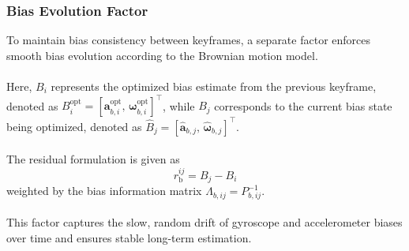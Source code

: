 \subsubsection{Bias Evolution Factor}
To maintain bias consistency between keyframes, a separate factor enforces smooth bias evolution according to the Brownian motion model.  
\\ \\
Here, $B_i$ represents the optimized bias estimate from the previous keyframe, denoted as $B_i^{\text{opt}} = [\mathbf{a}_{b,i}^{\text{opt}},\, \boldsymbol{\omega}_{b,i}^{\text{opt}}]^\top$, while $B_j$ corresponds to the current bias state being optimized, denoted as $\hat{B}_j = [\hat{\mathbf{a}}_{b,j},\, \hat{\boldsymbol{\omega}}_{b,j}]^\top$.  
\\ \\
The residual formulation is given as
$$
    r_{\text{b}}^{ij} = B_j - B_i
$$
weighted by the bias information matrix $\Lambda_{b,ij} = P_{b,ij}^{-1}$.  
\\ \\
This factor captures the slow, random drift of gyroscope and accelerometer biases over time and ensures stable long-term estimation.  

